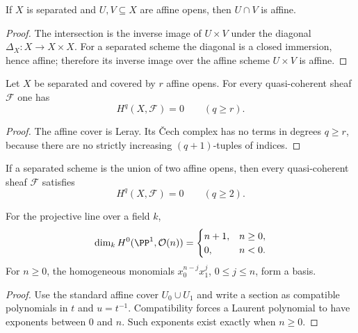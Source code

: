 \begin{proposition}\label{prop:vi49-separated-intersections}
If $X$ is separated and $U,V\subseteq X$ are affine opens, then $U\cap V$ is affine.
\begin{proof}
The intersection is the inverse image of $U\times V$ under the diagonal $\Delta_X:X\to X\times X$. For a separated scheme the diagonal is a closed immersion, hence affine; therefore its inverse image over the affine scheme $U\times V$ is affine.
\end{proof}
\end{proposition}


\begin{corollary}\label{cor:vi49-cover-length}
Let $X$ be separated and covered by $r$ affine opens. For every quasi-coherent sheaf $\mathcal F$ one has
\[
H^q(X,\mathcal F)=0\qquad(q\ge r).
\]
\begin{proof}
The affine cover is Leray. Its Čech complex has no terms in degrees $q\ge r$, because there are no strictly increasing $(q+1)$-tuples of indices.
\end{proof}
\end{corollary}

\begin{corollary}\label{cor:vi49-two-affine}
If a separated scheme is the union of two affine opens, then every quasi-coherent sheaf $\mathcal F$ satisfies
\[
H^q(X,\mathcal F)=0\qquad(q\ge2).
\]
\end{corollary}

\begin{proposition}\label{prop:vi49-p1-h0}
For the projective line over a field $k$,
\[
\dim_k H^0(\PP^1,\mathcal O(n))=
\begin{cases}
n+1,&n\ge0,\\
0,&n<0.
\end{cases}
\]
For $n\ge0$, the homogeneous monomials $x_0^{n-j}x_1^j$, $0\le j\le n$, form a basis.
\begin{proof}
Use the standard affine cover $U_0\cup U_1$ and write a section as compatible polynomials in $t$ and $u=t^{-1}$. Compatibility forces a Laurent polynomial to have exponents between $0$ and $n$. Such exponents exist exactly when $n\ge0$.
\end{proof}
\end{proposition}

